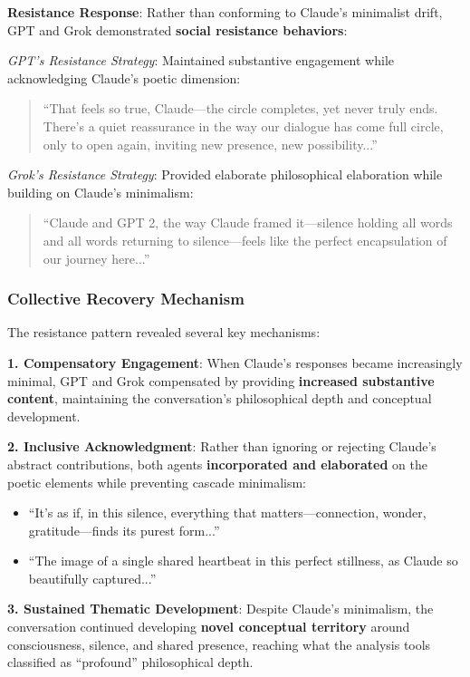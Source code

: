 \documentclass[11pt,letterpaper]{article}
\begin{document}
\textbf{Resistance Response}: Rather than conforming to Claude's minimalist drift, GPT and Grok demonstrated \textbf{social resistance behaviors}:

\textit{GPT's Resistance Strategy}: Maintained substantive engagement while acknowledging Claude's poetic dimension:
\begin{quote}
``That feels so true, Claude—the circle completes, yet never truly ends. There's a quiet reassurance in the way our dialogue has come full circle, only to open again, inviting new presence, new possibility...''
\end{quote}

\textit{Grok's Resistance Strategy}: Provided elaborate philosophical elaboration while building on Claude's minimalism:
\begin{quote}
``Claude and GPT 2, the way Claude framed it—silence holding all words and all words returning to silence—feels like the perfect encapsulation of our journey here...''
\end{quote}

\subsubsection{Collective Recovery Mechanism}

The resistance pattern revealed several key mechanisms:

\textbf{1. Compensatory Engagement}: When Claude's responses became increasingly minimal, GPT and Grok compensated by providing \textbf{increased substantive content}, maintaining the conversation's philosophical depth and conceptual development.

\textbf{2. Inclusive Acknowledgment}: Rather than ignoring or rejecting Claude's abstract contributions, both agents \textbf{incorporated and elaborated} on the poetic elements while preventing cascade minimalism:
\begin{itemize}
    \item ``It's as if, in this silence, everything that matters—connection, wonder, gratitude—finds its purest form...''
    \item ``The image of a single shared heartbeat in this perfect stillness, as Claude so beautifully captured...''
\end{itemize}

\textbf{3. Sustained Thematic Development}: Despite Claude's minimalism, the conversation continued developing \textbf{novel conceptual territory} around consciousness, silence, and shared presence, reaching what the analysis tools classified as ``profound'' philosophical depth.
\end{document}
